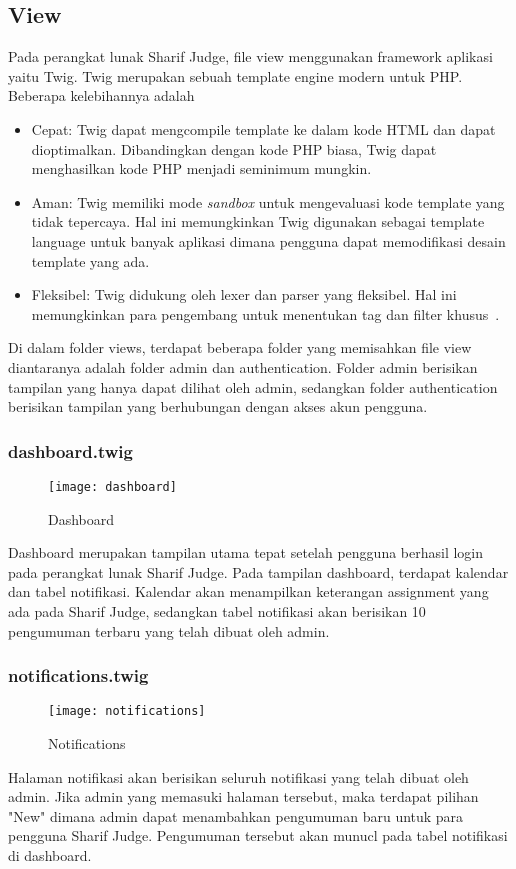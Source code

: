 \subsection{View}
Pada perangkat lunak Sharif Judge, file view menggunakan framework aplikasi yaitu Twig. Twig merupakan sebuah template engine modern untuk PHP. Beberapa kelebihannya adalah
\begin{itemize}
	\item Cepat: Twig dapat mengcompile template ke dalam kode HTML dan dapat dioptimalkan. Dibandingkan dengan kode PHP biasa, Twig dapat menghasilkan kode PHP menjadi seminimum mungkin.
	\item Aman: Twig memiliki mode \textit{sandbox} untuk mengevaluasi kode template yang tidak tepercaya. Hal ini memungkinkan Twig digunakan sebagai template language untuk banyak aplikasi dimana pengguna dapat memodifikasi desain template yang ada.
	\item Fleksibel: Twig didukung oleh lexer dan parser yang fleksibel. Hal ini memungkinkan para pengembang untuk menentukan tag dan filter khusus~\cite{fabien:09:twig}.
\end{itemize}

Di dalam folder views, terdapat beberapa folder yang memisahkan file view diantaranya adalah folder admin dan authentication. Folder admin berisikan tampilan yang hanya dapat dilihat oleh admin, sedangkan folder authentication berisikan tampilan yang berhubungan dengan akses akun pengguna.

\subsubsection{dashboard.twig}
\begin{figure}[H]
	\centering  
	\texttt{[image: dashboard]}  
	\caption[Dashboard]{Dashboard} 
	\label{fig:dashboard} 
\end{figure} 
Dashboard merupakan tampilan utama tepat setelah pengguna berhasil login pada perangkat lunak Sharif Judge. Pada tampilan dashboard, terdapat kalendar dan tabel notifikasi. Kalendar akan menampilkan keterangan assignment yang ada pada Sharif Judge, sedangkan tabel notifikasi akan berisikan 10 pengumuman terbaru yang telah dibuat oleh admin.

\subsubsection{notifications.twig}
\begin{figure}[H]
	\centering  
	\texttt{[image: notifications]}  
	\caption[Notifications]{Notifications} 
	\label{fig:notifications} 
\end{figure} 
Halaman notifikasi akan berisikan seluruh notifikasi yang telah dibuat oleh admin. Jika admin yang memasuki halaman tersebut, maka terdapat pilihan "New" dimana admin dapat menambahkan pengumuman baru untuk para pengguna Sharif Judge. Pengumuman tersebut akan munucl pada tabel notifikasi di dashboard.

